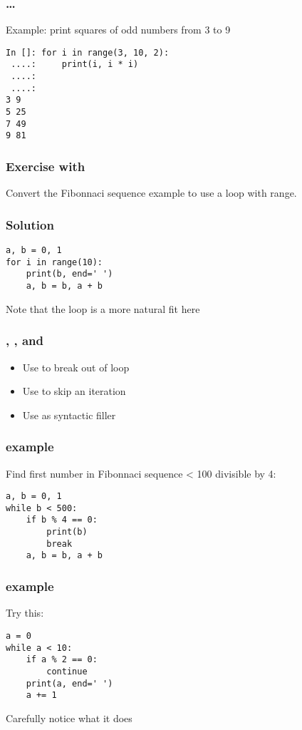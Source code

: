 \documentclass[14pt,compress]{beamer}
\begin{document}
\begin{frame}[fragile]
  \frametitle{ \ldots {}}
Example: print squares of odd numbers from 3 to 9
  \begin{lstlisting}
In []: for i in range(3, 10, 2):
 ....:     print(i, i * i)
 ....:
 ....:
3 9
5 25
7 49
9 81
\end{lstlisting}
\end{frame}

\begin{frame}
  \frametitle{Exercise with }

Convert the Fibonnaci sequence example to use a  loop with range.

\end{frame}

\begin{frame}[fragile]
  \frametitle{Solution}
\begin{lstlisting}
a, b = 0, 1
for i in range(10):
    print(b, end=' ')
    a, b = b, a + b
\end{lstlisting}
  \vspace*{2em}
Note that the  loop is a more natural fit here
\end{frame}

\begin{frame}
  \frametitle{, , and\  }
  \begin{itemize}
  \item Use  to break out of loop
  \item Use  to skip an iteration
  \item Use  as syntactic filler
  \end{itemize}
\end{frame}

\begin{frame}[fragile]
  \frametitle{ example}
  Find first number in Fibonnaci sequence < 100 divisible by 4:
\begin{lstlisting}
a, b = 0, 1
while b < 500:
    if b % 4 == 0:
        print(b)
        break
    a, b = b, a + b

\end{lstlisting}
\end{frame}

\begin{frame}[fragile]
  \frametitle{ example}
Try this:
\begin{lstlisting}
a = 0
while a < 10:
    if a % 2 == 0:
        continue
    print(a, end=' ')
    a += 1
\end{lstlisting}
Carefully notice what it does
\end{frame}
\end{document}

